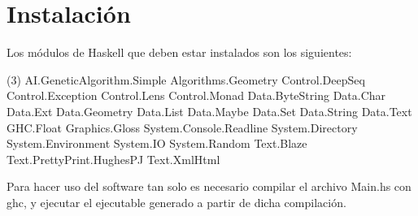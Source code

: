 \documentclass[a4paper,10pt]{article}
\begin{document}
\section*{Instalación}

\smallskip
    Los módulos de Haskell que deben estar instalados son los siguientes:

\normalsize
\begin{tasks}(3)
    \task[+] AI.GeneticAlgorithm.Simple
    \task[+] Algorithms.Geometry
    \task[+] Control.DeepSeq
    \task[+] Control.Exception
    \task[+] Control.Lens
    \task[+] Control.Monad
    \task[+] Data.ByteString
    \task[+] Data.Char
    \task[+] Data.Ext
    \task[+] Data.Geometry
    \task[+] Data.List
    \task[+] Data.Maybe
    \task[+] Data.Set
    \task[+] Data.String
    \task[+] Data.Text
    \task[+] GHC.Float
    \task[+] Graphics.Gloss
    \task[+] System.Console.Readline
    \task[+] System.Directory
    \task[+] System.Environment
    \task[+] System.IO
    \task[+] System.Random
    \task[+] Text.Blaze
    \task[+] Text.PrettyPrint.HughesPJ
    \task[+] Text.XmlHtml
\end{tasks}

\large
    Para hacer uso del software tan solo es necesario compilar el archivo Main.hs con ghc, y ejecutar el
    ejecutable generado a partir de dicha compilación.  
\end{document}

